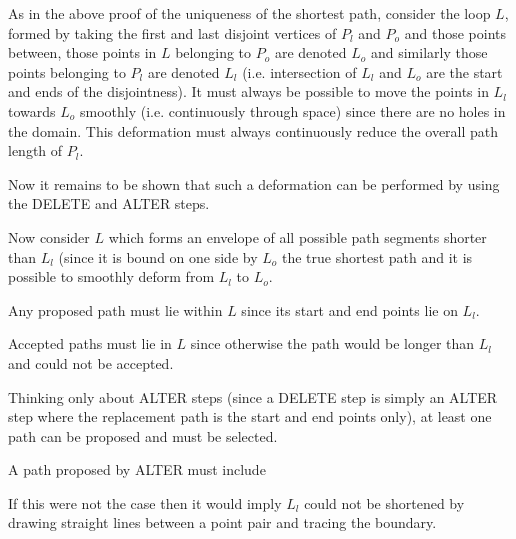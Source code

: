 As in the above proof of the uniqueness of the shortest path, consider the loop $L$, formed by taking the first and last disjoint vertices of $P_l$ and $P_o$ and those points between, those points in $L$ belonging to $P_o$ are denoted $L_o$ and similarly those points belonging to $P_l$ are denoted $L_l$ (i.e. intersection of $L_l$ and $L_o$ are the start and ends of the disjointness). It must always be possible to move the points in $L_l$ towards $L_o$ smoothly (i.e. continuously through space) since there are no holes in the domain. This deformation must always continuously reduce the overall path length of $P_l$.

Now it remains to be shown that such a deformation can be performed by using the DELETE and ALTER steps. 

Now consider $L$ which forms an envelope of all possible path segments shorter than $L_l$ (since it is bound on one side by $L_o$ the true shortest path and it is possible to smoothly deform from $L_l$ to $L_o$. 

Any proposed path must lie within $L$ since its start and end points lie on $L_l$.

Accepted paths must lie in $L$ since otherwise the path would be longer than $L_l$ and could not be accepted.


Thinking only about ALTER steps (since a DELETE step is simply an ALTER step where the replacement path is the start and end points only), at least one path can be proposed and must be selected. 

A path proposed by ALTER must include 

If this were not the case then it would imply $L_l$ could not be shortened by drawing straight lines between a point pair and tracing the boundary. 





